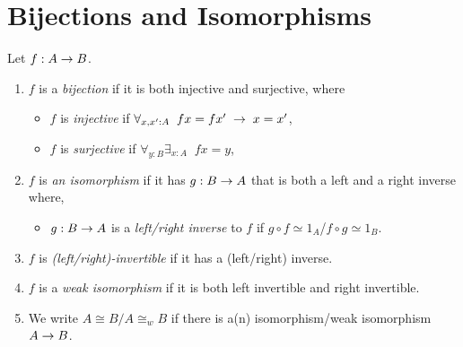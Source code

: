 \section{Bijections and Isomorphisms}

\begin{defn} \label{defn:isos}
Let $f:A\rightarrow B$.
\begin{enumerate}
\item $f$ is a {\em bijection} if it is both injective and surjective, where
\begin{itemize}
\item $f$ is {\em injective} if $\forall_{x,x':A}\; \; fx=fx'\;\rightarrow\; x=x'$,
\item $f$ is {\em surjective} if $\forall_{y:B}\exists_{x:A}\;\; fx=y$,
\end{itemize}
\item $f$ is {\em an isomorphism} if it has $g:B\rightarrow A$ that is both a left and a right
inverse where,
\begin{itemize} \item $g:B\rightarrow A$ is a {\em left/right inverse} to $f$ if 
$g\circ f\simeq 1_A$/$f\circ g\simeq 1_B$.
\end{itemize}
\item $f$ is {\em (left/right)-invertible} if it has a (left/right) inverse.
\item $f$ is a {\em weak isomorphism} if it is both left invertible and right invertible.
\item We write $A\cong B/A\cong_w B$ if there is a(n) isomorphism/weak isomorphism $A\rightarrow B$.
\end{enumerate}
\end{defn}


